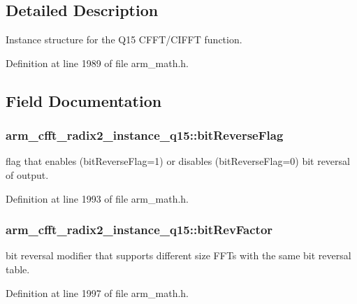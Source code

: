 \subsection{Detailed Description}
Instance structure for the Q15 C\-F\-F\-T/\-C\-I\-F\-F\-T function. 

Definition at line 1989 of file arm\-\_\-math.\-h.



\subsection{Field Documentation}
\hypertarget{structarm__cfft__radix2__instance__q15_af8300c1f60caa21e6b44b9240ab5af19}{
\subsubsection[{bit\-Reverse\-Flag}]{ arm\-\_\-cfft\-\_\-radix2\-\_\-instance\-\_\-q15\-::bit\-Reverse\-Flag}}\label{structarm__cfft__radix2__instance__q15_af8300c1f60caa21e6b44b9240ab5af19}
flag that enables (bit\-Reverse\-Flag=1) or disables (bit\-Reverse\-Flag=0) bit reversal of output. 

Definition at line 1993 of file arm\-\_\-math.\-h.

\hypertarget{structarm__cfft__radix2__instance__q15_a8722720c542cabd41df83fe88ef4f4cb}{
\subsubsection[{bit\-Rev\-Factor}]{ arm\-\_\-cfft\-\_\-radix2\-\_\-instance\-\_\-q15\-::bit\-Rev\-Factor}}\label{structarm__cfft__radix2__instance__q15_a8722720c542cabd41df83fe88ef4f4cb}
bit reversal modifier that supports different size F\-F\-Ts with the same bit reversal table. 

Definition at line 1997 of file arm\-\_\-math.\-h.

